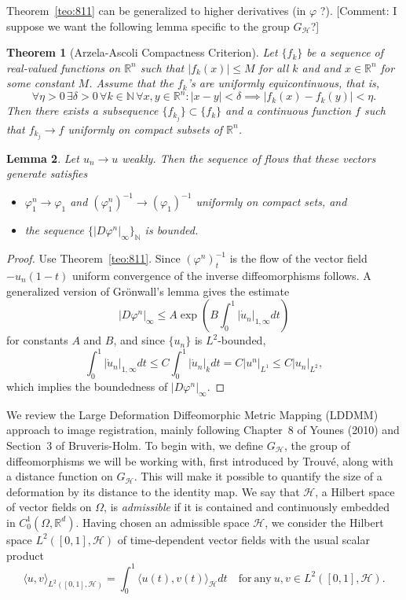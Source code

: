 \documentclass{article}
\theoremstyle{plain}
\newtheorem{teo}{Theorem}[section]
\newtheorem{lem}[teo]{Lemma}
\theoremstyle{definition}
\numberwithin{equation}{section}
\newcommand{\N}{\ensuremath{\mathbb{N}}}
\newcommand{\R}{\ensuremath{\mathbb{R}}}
\begin{document}
Theorem~\ref{teo:811} can be generalized to higher derivatives (in $\varphi$ ?). [Comment: I suppose we want the following lemma specific to the group $G_\mathcal{H}$?]

\begin{teo}[Arzela-Ascoli  Compactness  Criterion]
Let $\{f_k\}$ be a sequence of real-valued functions on $\R^n$  such that $|f_k(x)|\leq M$ for all $k$ and and $x\in\R^n$ for some constant $M$. Assume that the $f_k$'s are uniformly equicontinuous, that is, \[\forall \eta>0\,\exists\delta>0\,\forall k\in\N\,\forall x,y\in\R^n:|x-y|<\delta\implies|f_k(x)-f_k(y)|<\eta.\] Then there exists a subsequence $\{f_{k_j}\}\subset\{f_k\}$ and a continuous function $f$ such that $f_{k_j}\to f$ uniformly on compact subsets of $\R^n$.
\end{teo}

\begin{lem}
\label{lem:weak}
Let $u_n\to u$ weakly. Then the sequence of flows that these vectors generate satisfies 
\begin{itemize}
	\item $\varphi_1^n\to \varphi_1$ and $(\varphi_1^n)^{-1}\to (\varphi_1)^{-1}$ uniformly on compact sets, and
	\item the sequence $\{|D\varphi^n|_\infty\}_\N$ is bounded.
\end{itemize}
\end{lem}
\begin{proof}
Use Theorem~\ref{teo:811}. Since $(\varphi^n)_t^{-1}$ is the flow of the vector field $-u_n(1-t)$ uniform convergence of the inverse diffeomorphisms follows. A  generalized  version  of Grönwall's lemma gives the estimate
\[
|D\varphi^n|_\infty\leq A \exp\left(B\int_0^1 |\dot{u}_n|_{1,\infty}dt\right)
\]
for constants $A$ and $B$, and since $\{u_n\}$ is $L^2$-bounded,
\[
\int_0^1|\dot{u}_n|_{1,\infty}dt\leq C\int_0^1 |\dot{u}_n|_k dt =C|u^n|_{L^1}\leq C|u_n|_{L^2}, 
\]
which implies the boundedness of $|D\varphi^n|_\infty$.
\end{proof}



We review the Large Deformation Diffeomorphic Metric Mapping (LDDMM) approach to image registration, mainly following 
Chapter~8 of Younes (2010) and Section~3 of Bruveris-Holm. To begin with, we define $G_{\mathcal{H}}$, the group of diffeomorphisms we will be working with, first introduced by Trouvé, along with a distance function on $G_{\mathcal{H}}$. This will make it possible to quantify the size of a deformation by its distance to the identity map.  We say that $\mathcal{H}$, a Hilbert space of vector fields on $\Omega$, is \emph{admissible} if it is contained and continuously embedded in $C^1_0(\Omega,\mathbb{R}^d)$.  Having chosen an admissible space $\mathcal{H}$, we consider the Hilbert space $L^2([0,1],\mathcal{H})$ of time-dependent vector fields with the usual scalar product
$$\langle u,v\rangle_{L^2([0,1],\mathcal{H})}=\int_0^1\langle u(t),v(t)\rangle_{\mathcal{H}} d t\quad\mathrm{for\ any\ }u,v\in
L^2([0,1],\mathcal{H}).$$
\end{document}
